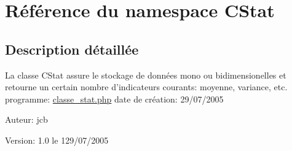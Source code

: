 \hypertarget{namespaceCStat}{
\section{R\'{e}f\'{e}rence du namespace CStat}
\label{namespaceCStat}
}




\subsection{Description d\'{e}taill\'{e}e}
La classe CStat assure le stockage de donn\'{e}es mono ou bidimensionelles et retourne un certain nombre d'indicateurs courants: moyenne, variance, etc. programme: \hyperlink{classe__stat_8php}{classe\_\-stat.php} date de cr\'{e}ation: 29/07/2005 \begin{Desc}
\item[Auteur:]jcb \end{Desc}
\begin{Desc}
\item[Version:]1.0  le 129/07/2005 \end{Desc}


